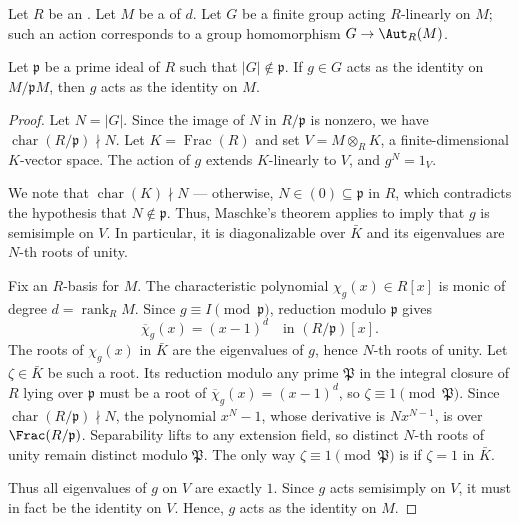 \begin{lemma}  \label{lemma:reduction_of_a_finite_group_acting_linearly_on_a_free_module_of_finite_rank_over_an_integral_domain_at_a_prime_not_containing_order_is_faithful}
    Let $R$ be an . Let $M$ be a  of  $d$. Let $G$ be a finite group acting $R$-linearly on $M$; such an action corresponds to a group homomorphism $G \to \Aut_R(M)$.

    Let $\mathfrak{p}$ be a prime ideal of $R$ such that $|G| \not \in \mathfrak{p}$. If $g \in G$ acts as the identity on $M/\mathfrak{p} M$, then $g$ acts as the identity on $M$. 
\end{lemma}

\begin{proof}
Let $N = |G|$. Since the image of $N$ in $R/\mathfrak{p}$ is nonzero, we have $\operatorname{char}(R/\mathfrak{p}) \nmid N$. Let $K = \operatorname{Frac}(R)$ and set $V = M \otimes_R K$, a finite-dimensional $K$-vector space. The action of $g$ extends $K$-linearly to $V$, and $g^N = 1_V$.

We note that $\operatorname{char}(K) \nmid N$ --- otherwise, $N \in (0)\subseteq \mathfrak{p}$ in $R$, which contradicts the hypothesis that $N \not \in \mathfrak{p}$. Thus, Maschke's theorem applies to imply that $g$ is semisimple on $V$. In particular, it is diagonalizable over $\bar{K}$ and its eigenvalues are $N$-th roots of unity.

Fix an $R$-basis for $M$. The characteristic polynomial $\chi_g(x) \in R[x]$ is monic of degree $d = \operatorname{rank}_R M$. Since $g \equiv I \pmod{\mathfrak{p}}$, reduction modulo $\mathfrak{p}$ gives
   $$\overline{\chi}_g(x) = (x-1)^d \quad \text{in } (R/\mathfrak{p})[x].$$
The roots of $\chi_g(x)$ in $\bar{K}$ are the eigenvalues of $g$, hence $N$-th roots of unity. Let $\zeta \in \bar{K}$ be such a root. Its reduction modulo any prime $\mathfrak{P}$ in the integral closure of $R$ lying over $\mathfrak{p}$ must be a root of $\overline{\chi}_g(x) = (x-1)^d$, so $\zeta \equiv 1 \pmod{\mathfrak{P}}$. Since $\operatorname{char}(R/\mathfrak{p}) \nmid N$, the polynomial $x^N - 1$, whose derivative is $Nx^{N-1}$, is  over $\Frac(R/\mathfrak{p})$. Separability lifts to any extension field, so distinct $N$-th roots of unity remain distinct modulo $\mathfrak{P}$. The only way $\zeta \equiv 1 \pmod{\mathfrak{P}}$ is if $\zeta = 1$ in $\bar{K}$.

Thus all eigenvalues of $g$ on $V$ are exactly $1$. Since $g$ acts semisimply on $V$, it must in fact be the identity on $V$. Hence, $g$ acts as the identity on $M$. 
\end{proof}